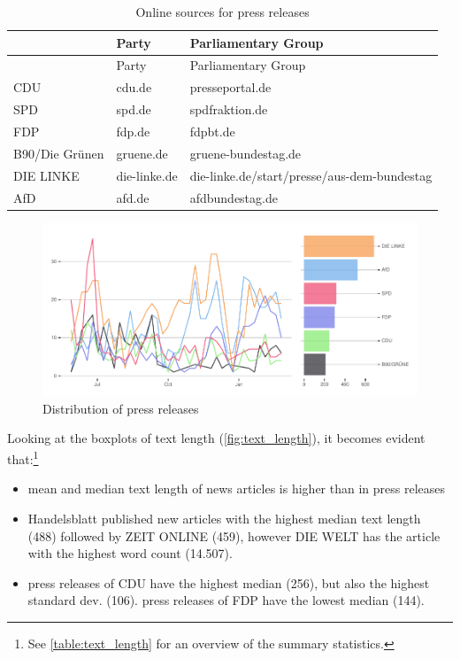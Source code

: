 \documentclass[
]{article}
\providecommand{\tightlist}{%
  \setlength{\itemsep}{0pt}\setlength{\parskip}{0pt}}
\begin{document}
\begin{longtable}[]{@{}lll@{}}
\caption{Online sources for press releases
\label{table:press_releases_sources}}\tabularnewline
\toprule
& Party & Parliamentary Group\tabularnewline
\midrule
\endfirsthead
\toprule
& Party & Parliamentary Group\tabularnewline
\midrule
\endhead
CDU & cdu.de & presseportal.de\tabularnewline
SPD & spd.de & spdfraktion.de\tabularnewline
FDP & fdp.de & fdpbt.de\tabularnewline
B90/Die Grünen & gruene.de & gruene-bundestag.de\tabularnewline
DIE LINKE & die-linke.de &
die-linke.de/start/presse/aus-dem-bundestag\tabularnewline
AfD & afd.de & afdbundestag.de\tabularnewline
\bottomrule
\end{longtable}

\begin{figure}

{\centering \includegraphics[width=0.9\linewidth]{main_text_files/figure-latex/press releases-1} 

}

\caption{Distribution of press releases \label{fig:press_distr}}\label{fig:press releases}
\end{figure}

Looking at the boxplots of text length (\autoref{fig:text_length}), it
becomes evident that:\footnote{See \autoref{table:text_length} for an
  overview of the summary statistics.}

\begin{itemize}
\tightlist
\item
  mean and median text length of news articles is higher than in press
  releases
\item
  Handelsblatt published new articles with the highest median text
  length (488) followed by ZEIT ONLINE (459), however DIE WELT has the
  article with the highest word count (14.507).
\item
  press releases of CDU have the highest median (256), but also the
  highest standard dev. (106). press releases of FDP have the lowest
  median (144).
\end{itemize}
\end{document}
